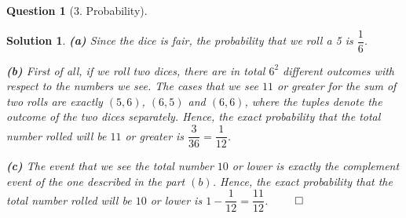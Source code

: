 \documentclass{article} %
\theoremstyle{quest}
\newtheorem*{question}{Question}
\newtheorem*{solution}{Solution}
\begin{document}
\begin{question}[3. Probability]
\end{question}
\begin{solution}
\textbf{(a)} Since the dice is fair, the probability that we roll a 5 is $\dfrac{1}{6}$.

\smallskip

\textbf{(b)} First of all, if we roll two dices, there are in total $6^2$ different 
outcomes with respect to the numbers we see. The cases that we see $11$ or greater for 
the sum of two rolls are exactly $(5,6)$, $(6,5)$ and $(6,6)$, where the tuples denote
the outcome of the two dices separately. Hence, the exact probability that the total
number rolled will be $11$ or greater is $\dfrac{3}{36} = \dfrac{1}{12}$. 

\smallskip

\textbf{(c)} The event that we see the total number $10$ or lower is exactly the complement event
of the one described in the part $(b)$. Hence, the exact probability that the total
number rolled will be $10$ or lower is $1 - \dfrac{1}{12} = \dfrac{11}{12}$. $\qed$

\end{solution}
\end{document}
